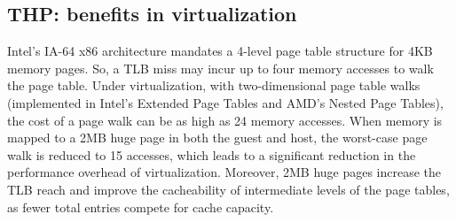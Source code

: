 %
%
%
\subsection{THP: benefits in virtualization}
Intel's IA-64 x86 architecture mandates a 4-level page table structure for 4KB
memory pages.  So, a TLB miss may incur up to four memory accesses to walk the page table. 
Under virtualization, with two-dimensional page table walks (implemented in Intel's
Extended Page Tables and AMD's Nested Page Tables), the cost of a page walk can be as high as
24 memory accesses\cite{Intel-sw-manual, AMD-NPT}.  When memory is mapped to a 2MB 
huge page in both the guest and host, the worst-case page walk is reduced to 15 accesses, which 
leads to a significant reduction in the performance overhead of virtualization. Moreover,
2MB huge pages increase the TLB reach and improve the cacheability of intermediate
levels of the page tables, as fewer total entries compete for cache capacity. 

